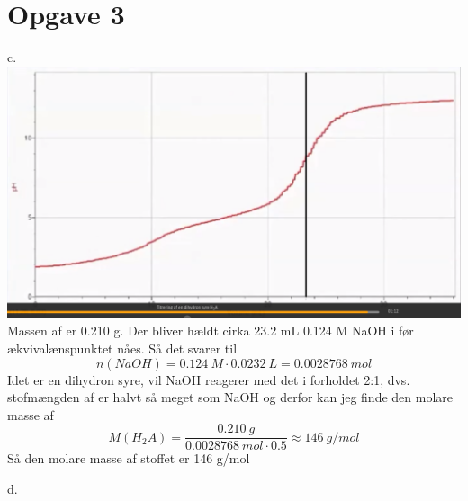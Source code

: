 \documentclass[12pt]{article}
\begin{document}
\section*{Opgave 3}

c.\\
\includegraphics[width=\textwidth]{screenshot.png}
Massen af  er 0.210 g. Der bliver hældt cirka 23.2 mL 0.124 M NaOH i før ækvivalænspunktet nåes. Så det svarer til
$$n(NaOH) = 0.124\ M \cdot 0.0232\ L = 0.0028768\ mol$$
Idet  er en dihydron syre, vil NaOH reagerer med det i forholdet 2:1, dvs. stofmængden af  er halvt så meget som
NaOH og derfor kan jeg finde den molare masse af 
$$M(H_2 A) = \frac{0.210\ g}{0.0028768\ mol \cdot 0.5} \approx 146\ g/mol$$
Så den molare masse af stoffet er 146 g/mol

d.
\end{document}
